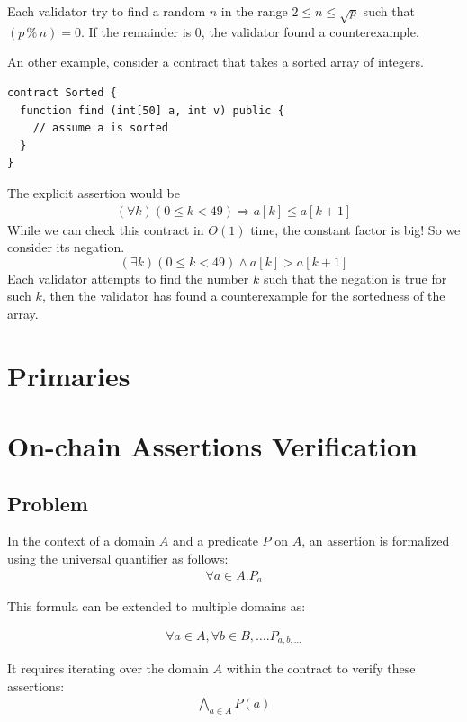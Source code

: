 \documentclass[runningheads]{llncs}
\begin{document}
Each validator try to find  a
random $n$ in the range $2 \le n \le 
\sqrt p$ such that $(p \mathbin{\%} n) = 0$. If the remainder is $0$, the validator found a counterexample.

An other example, consider a contract that takes a sorted array of integers.
\begin{lstlisting}[numbers=none]
contract Sorted {
  function find (int[50] a, int v) public {
    // assume a is sorted
  }
}
\end{lstlisting}
The explicit assertion would be
\begin{gather}\label{eq:1a}
  (\forall k) (0\le k <49) \Rightarrow a[k] \le a[k+1]
\end{gather}
While we can check this contract in $O(1)$ time, the constant factor is big! So we
consider its negation.
\begin{displaymath}
  (\exists k) (0\le k <49) \wedge a[k] > a[k+1]
\end{displaymath}
Each validator attempts to find the number $k$ such that the negation is true for such $k$, then the validator has found a counterexample for the sortedness of the array.
\section{Primaries}
\label{sec:primaries}


\section{On-chain Assertions Verification}
\label{sec:assertion-verification-onchain}
\subsection{Problem}

In the context of a domain $A$ and a predicate $P$ on $A$, an assertion is formalized using the universal quantifier as follows:
\begin{gather}
  \label{eq:1b}
\forall a \in A. P_{a}
\end{gather}

This formula can be extended to multiple domains as:

\begin{gather}
\label{eq:2}
\forall a \in A, \forall b \in B, \dots .P_{a, b, \dots}
\end{gather} 

It requires iterating over the domain \( A \) within the contract to verify these assertions:
\begin{gather}
  \label{eq:3}
  \bigwedge_{a \in A} P(a)
\end{gather}
\end{document}
